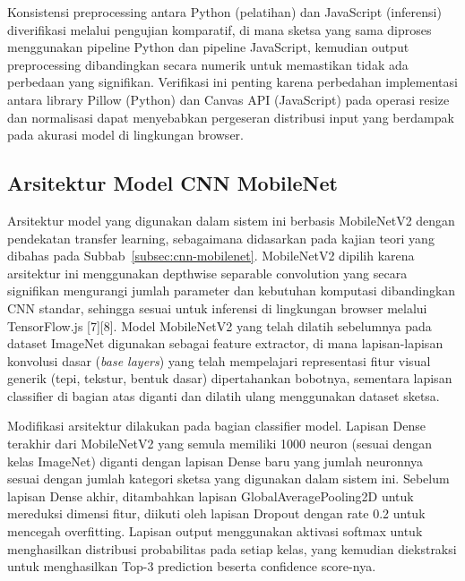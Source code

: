 \documentclass[12pt,oneside]{report}
\begin{document}
Konsistensi preprocessing antara Python (pelatihan) dan JavaScript (inferensi) diverifikasi melalui pengujian komparatif, di mana sketsa yang sama diproses menggunakan pipeline Python dan pipeline JavaScript, kemudian output preprocessing dibandingkan secara numerik untuk memastikan tidak ada perbedaan yang signifikan. Verifikasi ini penting karena perbedahan implementasi antara library Pillow (Python) dan Canvas API (JavaScript) pada operasi resize dan normalisasi dapat menyebabkan pergeseran distribusi input yang berdampak pada akurasi model di lingkungan browser.

\subsection{Arsitektur Model CNN MobileNet}
\label{subsec:arsitektur-model}

Arsitektur model yang digunakan dalam sistem ini berbasis MobileNetV2 dengan pendekatan transfer learning, sebagaimana didasarkan pada kajian teori yang dibahas pada Subbab~\ref{subsec:cnn-mobilenet}. MobileNetV2 dipilih karena arsitektur ini menggunakan depthwise separable convolution yang secara signifikan mengurangi jumlah parameter dan kebutuhan komputasi dibandingkan CNN standar, sehingga sesuai untuk inferensi di lingkungan browser melalui TensorFlow.js [7][8]. Model MobileNetV2 yang telah dilatih sebelumnya pada dataset ImageNet digunakan sebagai feature extractor, di mana lapisan-lapisan konvolusi dasar (\textit{base layers}) yang telah mempelajari representasi fitur visual generik (tepi, tekstur, bentuk dasar) dipertahankan bobotnya, sementara lapisan classifier di bagian atas diganti dan dilatih ulang menggunakan dataset sketsa.

Modifikasi arsitektur dilakukan pada bagian classifier model. Lapisan Dense terakhir dari MobileNetV2 yang semula memiliki 1000 neuron (sesuai dengan kelas ImageNet) diganti dengan lapisan Dense baru yang jumlah neuronnya sesuai dengan jumlah kategori sketsa yang digunakan dalam sistem ini. Sebelum lapisan Dense akhir, ditambahkan lapisan GlobalAveragePooling2D untuk mereduksi dimensi fitur, diikuti oleh lapisan Dropout dengan rate 0.2 untuk mencegah overfitting. Lapisan output menggunakan aktivasi softmax untuk menghasilkan distribusi probabilitas pada setiap kelas, yang kemudian diekstraksi untuk menghasilkan Top-3 prediction beserta confidence score-nya.
\end{document}
